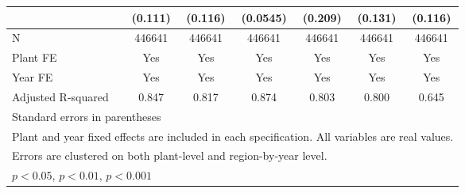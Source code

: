 \begin{table}[htbp]
\begin{tabular}{l*{6}{c}}
                &  (0.111)         &  (0.116)         & (0.0545)         &  (0.209)         &  (0.131)         &  (0.116)         \\
\midrule
N               &   446641         &   446641         &   446641         &   446641         &   446641         &   446641         \\
Plant FE        &      Yes         &      Yes         &      Yes         &      Yes         &      Yes         &      Yes         \\
Year FE         &      Yes         &      Yes         &      Yes         &      Yes         &      Yes         &      Yes         \\
Adjusted R-squared&    0.847         &    0.817         &    0.874         &    0.803         &    0.800         &    0.645         \\
\bottomrule
\multicolumn{7}{l}{\footnotesize Standard errors in parentheses}\\
\multicolumn{7}{l}{\footnotesize Plant and year fixed effects are included in each specification. All variables are real values.}\\
\multicolumn{7}{l}{\footnotesize Errors are clustered on both plant-level and region-by-year level. }\\
\multicolumn{7}{l}{\footnotesize \sym{*} \(p<0.05\), \sym{**} \(p<0.01\), \sym{***} \(p<0.001\)}\\
\end{tabular}
\end{table}
